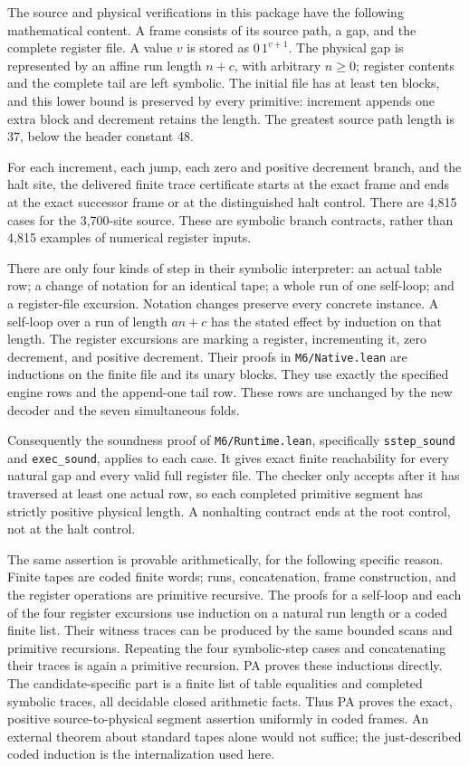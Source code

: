 The source and physical verifications in this package have the
following mathematical content. A frame consists of its source
path, a gap, and the complete register file. A value $v$ is stored
as $0\,1^{v+1}$. The physical gap is represented by an affine run
length $n+c$, with arbitrary $n\ge0$; register contents and the
complete tail are left symbolic. The initial file has at least ten
blocks, and this lower bound is preserved by every primitive:
increment appends one extra block and decrement retains the length.
The greatest source path length is 37, below the header constant 48.

For each increment, each jump, each zero and positive decrement
branch, and the halt site, the delivered finite trace certificate
starts at the exact frame and ends at the exact successor frame
or at the distinguished halt control. There are 4,815 cases for
the 3,700-site source. These are symbolic branch contracts, rather
than 4,815 examples of numerical register inputs.

There are only four kinds of step in their symbolic interpreter:
an actual table row; a change of notation for an identical tape;
a whole run of one self-loop; and a register-file excursion.
Notation changes preserve every concrete instance. A self-loop
over a run of length $an+c$ has the stated effect by induction on
that length. The register excursions are marking a register,
incrementing it, zero decrement, and positive decrement.
Their proofs in \texttt{M6/Native.lean} are inductions on the finite
file and its unary blocks. They use exactly the specified engine
rows and the append-one tail row. These rows are unchanged by the
new decoder and the seven simultaneous folds.

Consequently the soundness proof of
\texttt{M6/Runtime.lean}, specifically \texttt{sstep\_sound} and
\texttt{exec\_sound}, applies to each case. It gives exact
finite reachability for every natural gap and every valid full
register file. The checker only accepts after it has traversed at
least one actual row, so each completed primitive segment has
strictly positive physical length. A nonhalting contract ends at
the root control, not at the halt control.

The same assertion is provable arithmetically, for the following
specific reason. Finite tapes are coded finite words; runs,
concatenation, frame construction, and the register operations are
primitive recursive. The proofs for a self-loop and each of the
four register excursions use induction on a natural run length or
a coded finite list. Their witness traces can be produced by the
same bounded scans and primitive recursions. Repeating the four
symbolic-step cases and concatenating their traces is again a
primitive recursion. PA proves these inductions directly. The
candidate-specific part is a finite list of table equalities and
completed symbolic traces, all decidable closed arithmetic facts.
Thus PA proves the exact, positive source-to-physical segment
assertion uniformly in coded frames. An external theorem about
standard tapes alone would not suffice; the just-described coded
induction is the internalization used here.

